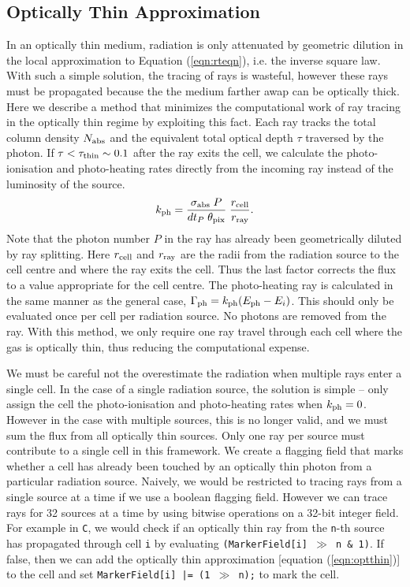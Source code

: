 \documentclass[useAMS,usenatbib]{mn2e}
\begin{document}
\subsection{Optically Thin Approximation}

In an optically thin medium, radiation is only attenuated by geometric
dilution in the local approximation to Equation (\ref{eqn:rteqn}),
i.e. the inverse square law.  With such a simple solution, the tracing
of rays is wasteful, however these rays must be propagated because the
the medium farther awap can be optically thick.  Here we describe a
method that minimizes the computational work of ray tracing in the
optically thin regime by exploiting this fact.  Each ray tracks the
total column density $N_{\rm abs}$ and the equivalent total optical
depth $\tau$ traversed by the photon.  If $\tau < \tau_{\rm thin} \sim
0.1$ after the ray exits the cell, we calculate the photo-ionisation
and photo-heating rates directly from the incoming ray instead of the
luminosity of the source.
\begin{equation}
  \label{eqn:optthin}
  k_{\rm ph} = \frac{\sigma_{\rm abs} \; P}{dt_P \; \theta_{\rm pix}}
  \; \frac{r_{\rm cell}}{r_{\rm ray}}.
\end{equation}
Note that the photon number $P$ in the ray has already been
geometrically diluted by ray splitting.  Here $r_{\rm cell}$ and
$r_{\rm ray}$ are the radii from the radiation source to the cell
centre and where the ray exits the cell.  Thus the last factor
corrects the flux to a value appropriate for the cell centre.  The
photo-heating ray is calculated in the same manner as the general
case, $\Gamma_{\rm ph} = k_{\rm ph} (E_{\rm ph} - E_i)$.  This should
only be evaluated once per cell per radiation source.  No photons are
removed from the ray.  With this method, we only require one ray
travel through each cell where the gas is optically thin, thus
reducing the computational expense.

We must be careful not the overestimate the radiation when multiple
rays enter a single cell.  In the case of a single radiation source,
the solution is simple -- only assign the cell the photo-ionisation
and photo-heating rates when $k_{\rm ph} = 0$.  However in the case
with multiple sources, this is no longer valid, and we must sum the
flux from all optically thin sources.  Only one ray per source must
contribute to a single cell in this framework.  We create a flagging
field that marks whether a cell has already been touched by an
optically thin photon from a particular radiation source.  Naively, we
would be restricted to tracing rays from a single source at a time if
we use a boolean flagging field.  However we can trace rays for 32
sources at a time by using bitwise operations on a 32-bit integer
field.  For example in \texttt{C}, we would check if an optically thin
ray from the \texttt{n}-th source has propagated through cell
\texttt{i} by evaluating \texttt{(MarkerField[i] $\gg$ n \& 1)}.  If
false, then we can add the optically thin approximation [equation
(\ref{eqn:optthin})] to the cell and set \texttt{MarkerField[i] |= (1
  $\gg$ n);} to mark the cell.
\end{document}
